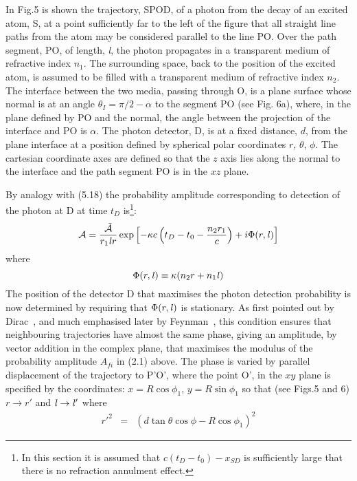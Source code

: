 {  In Fig.5 is shown the trajectory, SPOD, of a photon from the decay of an excited atom, S,
  at a point sufficiently far to the left of the figure that all straight line paths
  from the atom may be considered parallel to the line PO. Over the path segment, PO,
   of length, {\it l}, the photon propagates in a transparent medium of
   refractive index $n_1$. The surrounding space, back to the position of the excited atom, is 
    assumed to be filled with a transparent medium of refractive index $n_2$. The interface
 between the two media, passing through O, is a plane surface whose normal is at an angle
 $\theta_I = \pi/2-\alpha$ to the segment PO (see Fig. 6a), where, in the plane
  defined by PO and the normal, the angle between the projection of the interface and PO is
   $\alpha$. The photon detector, D,  is at a fixed distance,
  $d$, from the plane interface at a position defined by spherical polar coordinates $r$, $\theta$, $\phi$.
 The cartesian coordinate axes are defined so that the
  $z$ axis lies along the normal to the interface and the path segment PO is in the
  $xz$ plane.
 \par By analogy with (5.18) the probability amplitude corresponding to detection of the
  photon at D at time $t_D$ is\footnote{ In this section it is assumed that $c(t_D-t_0) -x_{SD}$
  is sufficiently large that there is no refraction annulment effect.}:
   \begin{equation}
{\cal A }    =  \frac{\tilde{\cal A}}{r_1 {\it l} r }
   \exp\left[ -\kappa c \left(t_D-t_0- \frac{n_2 r_1}{c}\right)+ i\Phi(r,{\it l}) \right]
 \end{equation}
    where
   \[ \Phi(r,{\it l}) \equiv \kappa (n_2 r +n_1 {\it l}) \] 
   The position of the detector D that maximises the photon detection probability is now determined by
  requiring that $ \Phi(r,{\it l})$ is stationary. As first pointed out by
   Dirac~\cite{Dirac2}, and much emphasised later by Feynman~\cite{Feyn5}, this condition ensures
   that neighbouring trajectories have almost the same phase, giving an amplitude, by vector addition
   in the complex plane, that maximises the modulus of the probability
   amplitude $A_{fi}$ in (2.1) above. 
   The phase is varied by parallel displacement of the trajectory to P'O',
   where the point O', in the $xy$ plane is specified by the coordinates: $x = R \cos \phi_1$,
   $y = R \sin \phi_1$ so that (see Figs.5 and 6) $r \rightarrow r'$ and ${\it l} \rightarrow {\it l}'$ where
  \begin{eqnarray}
   r'^2 & = & (d \tan \theta \cos \phi -R \cos \phi_1)^2

\end{eqnarray}}
